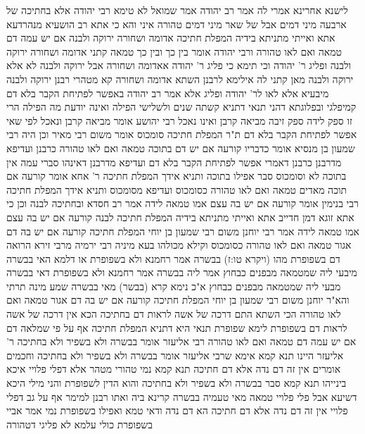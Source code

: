 \documentclass[12pt, openany]{book}
\begin{document}
{לישנא אחרינא אמרי לה אמר רב יהודה אמר שמואל לא טימא רבי יהודה אלא בחתיכה של ארבעה מיני דמים אבל של שאר מיני דמים טהורה 
איני והא כי אתא רב הושעיא מנהרדעא אתא ואייתי מתניתא בידיה המפלת חתיכה אדומה ושחורה ירוקה ולבנה אם יש עמה דם טמאה ואם לאו טהורה ורבי יהודה אומר בין כך ובין כך טמאה 
קתני אדומה ושחורה ירוקה ולבנה ופליג ר' יהודה 
וכי תימא כי פליג ר' יהודה אאדומה ושחורה אבל ירוקה ולבנה לא אלא ירוקה ולבנה מאן קתני לה 
אילימא לרבנן השתא אדומה ושחורה קא מטהרי רבנן ירוקה ולבנה מיבעיא אלא לאו לר' יהודה ופליג
אלא אמר רב יהודה באפשר לפתיחת הקבר בלא דם קמיפלגי ובפלוגתא דהני תנאי דתניא קשתה שנים ולשלישי הפילה ואינה יודעת מה הפילה הרי זו ספק לידה ספק זיבה מביאה קרבן ואינו נאכל 
רבי יהושע אומר מביאה קרבן ונאכל לפי שאי אפשר לפתיחת הקבר בלא דם 
ת"ר המפלת חתיכה סומכוס אומר משום רבי מאיר וכן היה רבי שמעון בן מנסיא אומר כדבריו קורעה אם יש דם בתוכה טמאה ואם לאו טהורה 
כרבנן ועדיפא מדרבנן כרבנן דאמרי אפשר לפתיחת הקבר בלא דם ועדיפא מדרבנן דאינהו סברי עמה אין בתוכה לא וסומכוס סבר אפילו בתוכה 
ותניא אידך המפלת חתיכה ר' אחא אומר קורעה אם תוכה מאדים טמאה ואם לאו טהורה 
כסומכוס ועדיפא מסומכוס 
ותניא אידך המפלת חתיכה רבי בנימין אומר קורעה אם יש בה עצם אמו טמאה לידה אמר רב חסדא ובחתיכה לבנה וכן כי אתא זוגא דמן חדייב אתא ואייתי מתניתא בידיה המפלת חתיכה לבנה קורעה אם יש בה עצם אמו טמאה לידה 
אמר רבי יוחנן משום רבי שמעון בן יוחי המפלת חתיכה קורעה אם יש בה דם אגור טמאה ואם לאו טהורה כסומכוס וקילא מכולהו 
בעא מיניה רבי ירמיה מרבי זירא הרואה דם בשפופרת מהו (ויקרא טו:ז) בבשרה אמר רחמנא ולא בשפופרת או דלמא האי בבשרה מיבעי ליה שמטמאה מבפנים כבחוץ 
אמר ליה בבשרה אמר רחמנא ולא בשפופרת דאי בבשרה מבעי ליה שמטמאה מבפנים כבחוץ א"כ נימא קרא (בבשר) מאי בבשרה שמע מינה תרתי 
והא"ר יוחנן משום רבי שמעון בן יוחי המפלת חתיכה קורעה אם יש בה דם אגור טמאה ואם לאו טהורה 
הכי השתא התם דרכה של אשה לראות דם בחתיכה הכא אין דרכה של אשה לראות דם בשפופרת 
לימא שפופרת תנאי היא דתניא המפלת חתיכה אף על פי שמלאה דם אם יש עמה דם טמאה ואם לאו טהורה רבי אליעזר אומר בבשרה ולא בשפיר ולא בחתיכה 
ר' אליעזר היינו תנא קמא אימא שרבי אליעזר אומר בבשרה ולא בשפיר ולא בחתיכה
וחכמים אומרים אין זה דם נדה אלא דם חתיכה תנא קמא נמי טהורי מטהר אלא דפלי פלויי איכא בינייהו
תנא קמא סבר בבשרה ולא בשפיר ולא בחתיכה והוא הדין לשפופרת והני מילי היכא דשיעא אבל פלי פלויי טמאה מאי טעמיה בבשרה קרינא ביה 
ואתו רבנן למימר אף על גב דפלי פלויי אין זה דם נדה אלא דם חתיכה הא דם נדה ודאי טמא ואפילו בשפופרת נמי 
אמר אביי בשפופרת כולי עלמא לא פליגי דטהורה}
\end{document}
